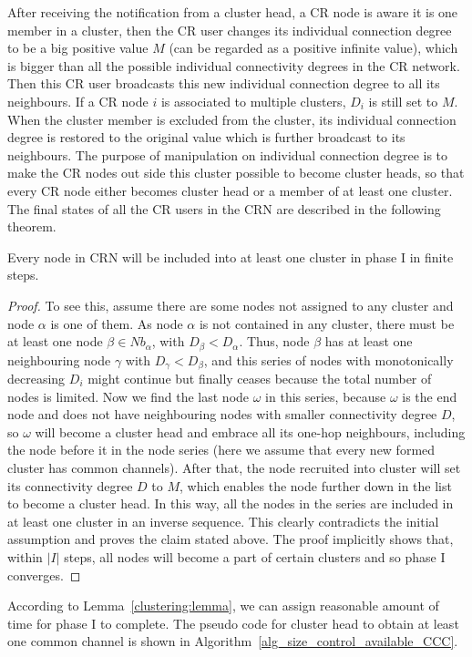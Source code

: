 After receiving the notification from a cluster head, a CR node is aware it is one member in a cluster, then the CR user changes its individual connection degree to be a big positive value $M$ (can be regarded as a positive infinite value), which is bigger than all the possible individual connectivity degrees in the CR network.
Then this CR user broadcasts this new individual connection degree to all its neighbours. 
If a CR node $i$ is associated to multiple clusters, $D_i$ is still set to $M$. %
When the cluster member is excluded from the cluster, its individual connection degree is restored to the original value which is further broadcast to its neighbours.
The purpose of manipulation on individual connection degree is to make the CR nodes out side this cluster possible to become cluster heads, so that every CR node either becomes cluster head or a member of at least one cluster.
The final states of all the CR users in the CRN are described in the following theorem.
\begin{lemma}
\label{clustering:lemma}
Every node in CRN will be included into at least one cluster in phase I in finite steps.
\end{lemma}

\begin{proof}
To see this, assume there are some nodes not assigned to any cluster and node $\alpha$ is one of them. As node $\alpha$ is not contained in any cluster, there must be at least one node $\beta\in Nb_\alpha$, with $D_{\beta} < D_{\alpha}$. Thus, node $\beta$ has at least one neighbouring node $\gamma$ with $D_{\gamma}<D_{\beta}$, and this series of nodes with monotonically decreasing $D_i$ might continue but finally ceases because the total number of nodes is limited. Now we find the last node $\omega$ in this series, because $\omega$ is the end node and does not have neighbouring nodes with smaller connectivity degree $D$, so $\omega$ will become a cluster head and embrace all its one-hop neighbours, including the node before it in the node series (here we assume that every new formed cluster has common channels). After that, the node recruited into cluster will set its connectivity degree $D$ to $M$, which enables the node further down in the list to become a cluster head. In this way, all the nodes in the series are included in at least one cluster in an inverse sequence. This clearly contradicts the initial assumption and proves the claim stated above. The proof implicitly shows that, within $\vert I \vert$ steps, all nodes will become a part of certain clusters and so phase I converges.
\end{proof}
According to Lemma~\ref{clustering:lemma}, we can assign reasonable amount of time for phase I to complete.
The pseudo code for cluster head to obtain at least one common channel is shown in Algorithm~\ref{alg_size_control_available_CCC}.



